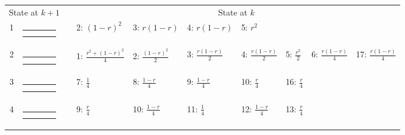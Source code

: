 \begin{center}
\begin{tabular}{ccclllllll} \hline
\multicolumn{2}{c}{State at $k+1$} & &
\multicolumn{7}{c}{State at $k$} \\
\cline{1-2} \cline{4-10}
1 &
{\renewcommand{\arraystretch}{0.3}
\renewcommand{\tabcolsep}{0.5mm}
\parbox[b][3mm][c]{12mm}{
\begin{tabular}{|p{2mm}|p{2mm}||p{2mm}|p{2mm}|} \hline
$\bullet$ & $\bullet$ &           &           \\
$\bullet$ & $\circ  $ &           &           \\ \hline
\end{tabular}}}
&
& 2: $(1-r)^2$
& 3: $r(1-r)$
& 4: $r(1-r)$
& 5: $r^2$
& & & \\
2 &
{\renewcommand{\arraystretch}{0.3}
\renewcommand{\tabcolsep}{0.5mm}
\parbox[b][3mm][c]{12mm}{
\begin{tabular}{|p{2mm}|p{2mm}||p{2mm}|p{2mm}|} \hline
$\bullet$ &           & $\bullet$ &           \\
$\bullet$ &           & $\circ  $ &           \\ \hline
\end{tabular}}}
&
& 1: $\frac{r^2+(1-r)^2}{4}$
& 2: $\frac{(1-r)^2}{2}$
& 3: $\frac{r(1-r)}{2}$
& 4: $\frac{r(1-r)}{2}$
& 5: $\frac{r^2}{2}$
& 6: $\frac{r(1-r)}{4}$
& 17: $\frac{r(1-r)}{4}$
\\
3 &
{\renewcommand{\arraystretch}{0.3}
\renewcommand{\tabcolsep}{0.5mm}
\parbox[b][3mm][c]{12mm}{
\begin{tabular}{|p{2mm}|p{2mm}||p{2mm}|p{2mm}|} \hline
$\bullet$ &           & $\bullet$ &           \\
$\bullet$ &           &           & $\circ  $ \\ \hline
\end{tabular}}}
&
& 7: $\frac{1}{4}$
& 8: $\frac{1-r}{4}$
& 9: $\frac{1-r}{4}$
& 10: $\frac{r}{4}$
& 16: $\frac{r}{4}$
& & \\
4 &
{\renewcommand{\arraystretch}{0.3}
\renewcommand{\tabcolsep}{0.5mm}
\parbox[b][3mm][c]{12mm}{
\begin{tabular}{|p{2mm}|p{2mm}||p{2mm}|p{2mm}|} \hline
$\bullet$ &           & $\bullet$ &           \\
          & $\bullet$ & $\circ  $ &           \\ \hline
\end{tabular}}}
&
& 9: $\frac{r}{4}$
& 10: $\frac{1-r}{4}$
& 11: $\frac{1}{4}$
& 12: $\frac{1-r}{4}$
& 13: $\frac{r}{4}$
& & \\

\end{tabular}
\end{center}
